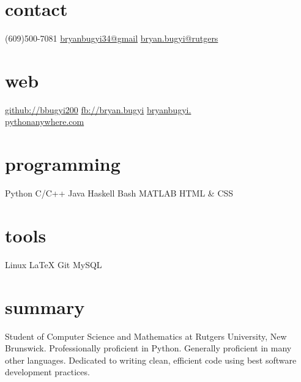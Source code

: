 \documentclass[]{friggeri-cv}
\newlength\myheight
\newlength\mydepth
\newcommand*\inlinegraphics[2]{%
  \settototalheight\myheight{Xygp}%
  \settodepth\mydepth{Xygp}%
  \raisebox{-\mydepth}{\texttt{[image: \#1]}}%
}
\begin{document}

\begin{aside}
  \section{contact}
    (609)500-7081
    \href{mailto:bryanbugyi34@gmail.com}{bryanbugyi34@gmail}
    \href{mailto:bryan.bugyi@rutgers.edu}{bryan.bugyi@rutgers}
  \section{web}
    \href{https://github.com/bbugyi200}{github://bbugyi200}
    \href{http://facebook.com/bryan.bugyi}{fb://bryan.bugyi}\vspace{0.3cm}
    \href{http://bryanbugyi.pythonanywhere.com}{bryanbugyi.\\pythonanywhere.com}
  \section{programming}
    \inlinegraphics{heart.jpg}{5} Python
    C/C++
    Java
    Haskell
    Bash
    MATLAB
    HTML \& CSS
 \section{tools}
	Linux
	\LaTeX
	Git
	MySQL
\end{aside}

\section{summary}
    { \small
        Student of Computer Science and Mathematics at Rutgers University, New Brunswick. Professionally proficient in Python. Generally proficient in many other languages. Dedicated to writing clean, efficient code using best software development practices.
    }
\end{document}
